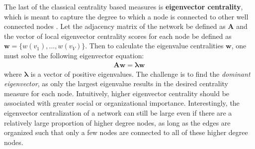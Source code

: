 \documentclass[3p,times]{elsarticle}
\begin{document}
The last of the classical centrality based measures is \textbf{eigenvector centrality}, which is meant to capture the degree to which a node is connected to other well connected nodes \cite{eigen}. Let the adjacency matrix of the network be defined as $\mathbf{A}$ and the vector of local eigenvector centrality scores for each node be defined as $\mathbf{w}=\{w({v_{1}}),...,w(v_{V})\}$. Then to calculate the eigenvalue centralities $\mathbf{w}$, one must solve the following eigenvector equation: 
\begin{align}
	\mathbf{A}  \mathbf{w}=  \mathbf{\lambda} \mathbf{w}
\end{align}
where $\mathbf{\lambda}$ is a vector of positive eigenvalues. The challenge is to find the \emph{dominant eigenvector}, as only the largest eigenvalue results in the desired centrality measure for each node. Intuitively, higher eigenvector centrality should be associated with greater social or organizational importance. Interestingly, the eigenvector centralization of a network can still be large even if there are a relatively large proportion of higher degree nodes, as long as the edges are organized such that only a few nodes are connected to all of these higher degree nodes.
\end{document}
